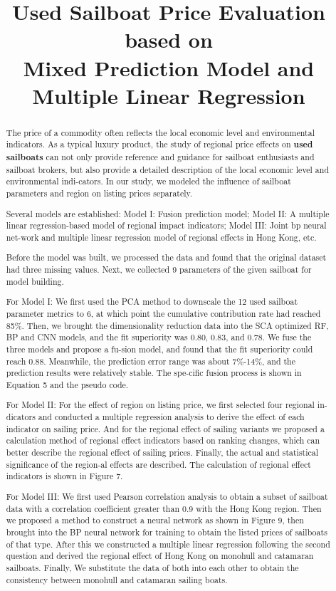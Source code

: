 \documentclass[12pt]{article}  %
\title{ Used Sailboat Price Evaluation based on \\Mixed Prediction Model and Multiple Linear Regression}  %
\begin{document}
\begin{abstract}
    The price of a commodity often reflects the local economic level
    and environmental indicators. As a typical luxury product, the
    study of regional price effects on \textbf{used sailboats} can not only
    provide reference and guidance for sailboat enthusiasts and
    sailboat brokers, but also provide a detailed description of
    the local economic level and environmental indi-cators.
    In our study, we modeled the influence of sailboat parameters
    and region on listing prices separately.
    
    Several models are established: Model I: Fusion prediction model;
    Model II: A multiple linear regression-based model of regional
    impact indicators; Model III: Joint bp neural net-work and multiple
    linear regression model of regional effects in Hong Kong, etc.

    Before the model was built, we processed the data and found that
    the original dataset had three missing values. Next, we collected 
    9 parameters of the given sailboat for model building.

    For Model I: We first used the PCA method to downscale the 12 used
    sailboat parameter metrics to 6, at which point the cumulative
    contribution rate had reached 85\%.
    Then, we brought the dimensionality reduction data into the SCA
    optimized RF, BP and CNN models, and the fit superiority was 0.80, 
    0.83, and 0.78. We fuse the three models and propose a fu-sion model, 
    and found that the fit superiority could reach 0.88. Meanwhile, the prediction 
    error range was about 7\%-14\%, and the prediction results were relatively 
    stable. The spe-cific fusion process is shown in Equation 5 and the pseudo 
    code.

    For Model II: For the effect of region on listing price, we first selected 
    four regional in-dicators and conducted a multiple regression analysis to 
    derive the effect of each indicator on sailing price. And for the regional 
    effect of sailing variants we proposed a calculation method of regional 
    effect indicators based on ranking changes, which can better describe the
    regional effect of sailing prices. Finally, the actual and statistical 
    significance of the region-al effects are described. The calculation of 
    regional effect indicators is shown in Figure 7.


    For Model III: We first used Pearson correlation analysis to obtain a subset 
    of sailboat data with a correlation coefficient greater than 0.9 with the 
    Hong Kong region. Then we proposed a method to construct a neural network 
    as shown in Figure 9, then brought into the BP neural network for training 
    to obtain the listed prices of sailboats of that type. After this we 
    constructed a multiple linear regression following the second question and 
    derived the regional effect of Hong Kong on monohull and catamaran sailboats. 
    Finally, We substitute the data of both into each other to obtain the 
    consistency between monohull and catamaran sailing boats.


\end{abstract}
\end{document}
